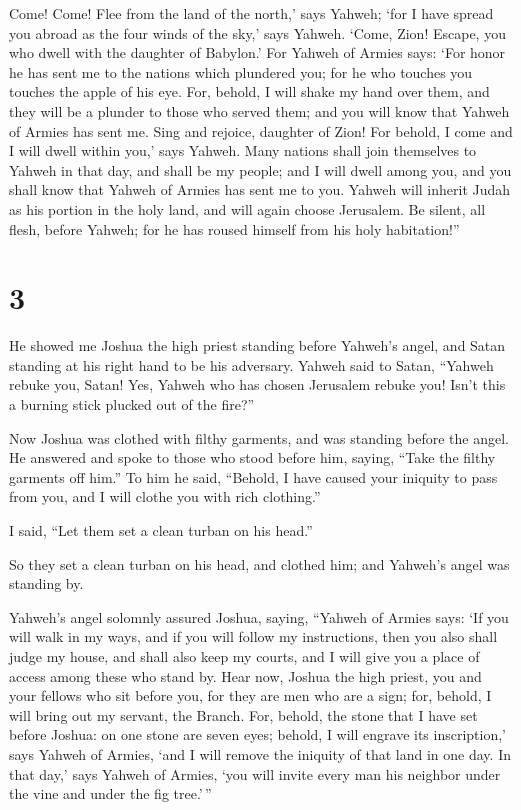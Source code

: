  Come! Come! Flee from the land of the north,' says
Yahweh; `for I have spread you abroad as the four winds of the sky,'
says Yahweh.  `Come, Zion! Escape, you who dwell with the
daughter of Babylon.'  For Yahweh of Armies says: `For
honor he has sent me to the nations which plundered you; for he who
touches you touches the apple of his eye.  For, behold, I
will shake my hand over them, and they will be a plunder to those who
served them; and you will know that Yahweh of Armies has sent me.
 Sing and rejoice, daughter of Zion! For behold, I come
and I will dwell within you,' says Yahweh.  Many nations
shall join themselves to Yahweh in that day, and shall be my people; and
I will dwell among you, and you shall know that Yahweh of Armies has
sent me to you.  Yahweh will inherit Judah as his portion
in the holy land, and will again choose Jerusalem.  Be
silent, all flesh, before Yahweh; for he has roused himself from his
holy habitation!''

\hypertarget{section-2}{%
\section{3}\label{section-2}}

 He showed me Joshua the high priest standing before
Yahweh's angel, and Satan standing at his right hand to be his
adversary.  Yahweh said to Satan, ``Yahweh rebuke you,
Satan! Yes, Yahweh who has chosen Jerusalem rebuke you! Isn't this a
burning stick plucked out of the fire?''

 Now Joshua was clothed with filthy garments, and was
standing before the angel.  He answered and spoke to those
who stood before him, saying, ``Take the filthy garments off him.'' To
him he said, ``Behold, I have caused your iniquity to pass from you, and
I will clothe you with rich clothing.''

 I said, ``Let them set a clean turban on his head.''

So they set a clean turban on his head, and clothed him; and Yahweh's
angel was standing by.

 Yahweh's angel solomnly assured Joshua, saying,
 ``Yahweh of Armies says: `If you will walk in my ways,
and if you will follow my instructions, then you also shall judge my
house, and shall also keep my courts, and I will give you a place of
access among these who stand by.  Hear now, Joshua the
high priest, you and your fellows who sit before you, for they are men
who are a sign; for, behold, I will bring out my servant, the Branch.
 For, behold, the stone that I have set before Joshua: on
one stone are seven eyes; behold, I will engrave its inscription,' says
Yahweh of Armies, `and I will remove the iniquity of that land in one
day.  In that day,' says Yahweh of Armies, `you will
invite every man his neighbor under the vine and under the fig
tree.'\,''

